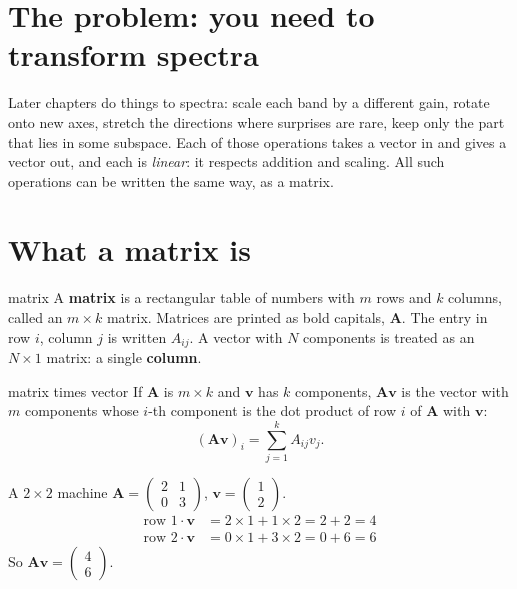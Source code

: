 \documentclass[11pt,a4paper,oneside,openany]{book}
\newcommand{\B}[1]{{\symbf{#1}}}
\newcommand{\B}[1]{{\bm{#1}}}
\newcommand{\vv}{\B{v}}
\newcommand{\mA}{\B{A}}
\begin{document}
\section{The problem: you need to transform spectra}

Later chapters do things to spectra: scale each band by a different gain, rotate onto new axes, stretch the directions
where surprises are rare, keep only the part that lies in some subspace. Each of those operations takes a vector in and
gives a vector out, and each is \emph{linear}: it respects addition and scaling. All such operations can be written the same
way, as a matrix.

\section{What a matrix is}

\begin{defn}{matrix}
A \textbf{matrix} is a rectangular table of numbers with $m$ rows and $k$ columns, called an $m\times k$ matrix. Matrices are
printed as bold capitals, $\mA$. The entry in row $i$, column $j$ is written $A_{ij}$. A vector with $N$ components is treated
as an $N\times1$ matrix: a single \textbf{column}.
\end{defn}

\begin{defn}{matrix times vector}
If $\mA$ is $m\times k$ and $\vv$ has $k$ components, $\mA\vv$ is the vector with $m$ components whose $i$-th component is the
dot product of row $i$ of $\mA$ with $\vv$:
\[
  (\mA\vv)_i=\sum_{j=1}^{k}A_{ij}v_j .
\]
\end{defn}

\begin{worked}[label=we:matvec]{A $2\times2$ machine}
$\mA=\begin{pmatrix}2&1\\0&3\end{pmatrix}$, $\vv=\begin{pmatrix}1\\2\end{pmatrix}$.
\begin{align*}
\text{row 1}\cdot\vv &= 2\times1+1\times2=2+2=4\\
\text{row 2}\cdot\vv &= 0\times1+3\times2=0+6=6
\end{align*}
So $\mA\vv=\begin{pmatrix}4\\6\end{pmatrix}$.
\end{worked}
\end{document}
